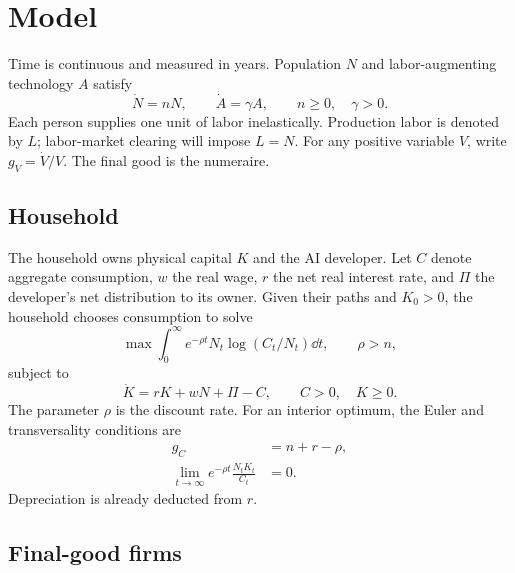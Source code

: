 \section{Model}
\label{sec:companion-model}

Time is continuous and measured in years. Population $N$ and labor-augmenting
technology $A$ satisfy
\begin{equation}
 \dot N=nN,\qquad \dot A=\gamma A,
 \qquad n\geq0,\quad\gamma>0.
 \label{eq:companion-exogenous}
\end{equation}
Each person supplies one unit of labor inelastically. Production labor is
denoted by $L$; labor-market clearing will impose $L=N$. For any positive
variable $V$, write $g_V=\dot V/V$. The final good is the numeraire.

\subsection{Household}

The household owns physical capital $K$ and the AI developer. Let $C$ denote
aggregate consumption, $w$ the real wage, $r$ the net real interest rate, and
$\Pi$ the developer's net distribution to its owner. Given their paths and
$K_0>0$, the household chooses consumption to solve
\begin{equation}
 \max\int_0^\infty e^{-\rho t}N_t\log(C_t/N_t)\dd t,
 \qquad \rho>n,
 \label{eq:companion-household-objective}
\end{equation}
subject to
\begin{equation}
 \dot K=rK+wN+\Pi-C,\qquad C>0,\quad K\geq0.
 \label{eq:companion-household-budget}
\end{equation}
The parameter $\rho$ is the discount rate. For an interior optimum, the Euler
and transversality conditions are
\begin{align}
 g_C&=n+r-\rho,\label{eq:companion-euler}\\
 \lim_{t\to\infty}e^{-\rho t}\frac{N_tK_t}{C_t}&=0.
 \label{eq:companion-household-tvc}
\end{align}
Depreciation is already deducted from $r$.

\subsection{Final-good firms}

